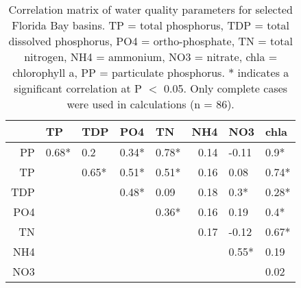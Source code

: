 \begin{table}[ht]
\centering
\caption{Correlation matrix of water quality parameters for selected Florida Bay basins. TP = total phosphorus, TDP = total dissolved phosphorus, PO4 = ortho-phosphate, TN = total nitrogen, NH4 = ammonium, NO3 = nitrate, chla = chlorophyll a, PP = particulate phosphorus. $*$ indicates a significant correlation at P $<$ 0.05. Only complete cases were used in calculations (n = 86).} 
\begin{tabular}{rllllrll}
  \hline
 & TP & TDP & PO4 & TN & NH4 & NO3 & chla \\ 
  \hline
PP & 0.68* & 0.2 & 0.34* & 0.78* & 0.14 & -0.11 & 0.9* \\ 
  TP &  & 0.65* & 0.51* & 0.51* & 0.16 & 0.08 & 0.74* \\ 
  TDP &  &  & 0.48* & 0.09 & 0.18 & 0.3* & 0.28* \\ 
  PO4 &  &  &  & 0.36* & 0.16 & 0.19 & 0.4* \\ 
  TN &  &  &  &  & 0.17 & -0.12 & 0.67* \\ 
  NH4 &  &  &  &  &  & 0.55* & 0.19 \\ 
  NO3 &  &  &  &  &  &  & 0.02 \\ 
   \hline
\end{tabular}
\end{table}
